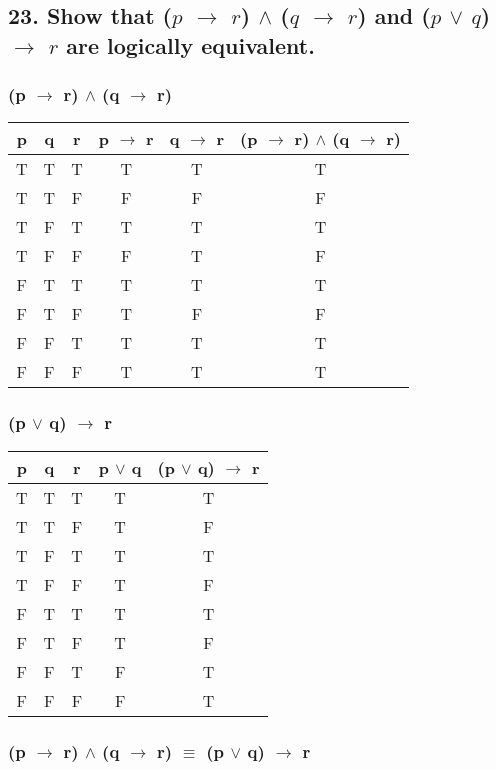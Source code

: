 \documentclass[11pt, oneside]{article} %
\numberwithin{equation}{section} %
\numberwithin{figure}{section} %
\numberwithin{table}{section} %
\begin{document}
\begin{table}[!htbp]
\subsection{23. Show that ($p$ $\rightarrow$ $r$) $\wedge$ ($q$ $\rightarrow$ $r$) and ($p$ $\vee$ $q$) $\rightarrow$ $r$ are logically equivalent.}
\subsubsection{(p $\rightarrow$ r) $\wedge$ (q $\rightarrow$ r)}
\begin{tabular}{c c c c c c}
\hline\hline
p & q & r & p $\rightarrow$ r & q $\rightarrow$ r & (p $\rightarrow$ r) $\wedge$ (q $\rightarrow$ r)\\ [0.5ex] 
\hline
T & T & T & T & T & T\\
T & T & F & F & F & F\\
T & F & T & T & T & T\\
T & F & F & F & T & F\\
F & T & T & T & T & T\\
F & T & F & T & F & F\\
F & F & T & T & T & T\\
F & F & F & T & T & T\\ [1ex]
\hline
\end{tabular}
\label{table:nonlin}
\end{table}

\begin{table}[!htbp]
\subsubsection{(p $\vee$ q) $\rightarrow$ r}
\begin{tabular}{c c c c c}
\hline\hline
p & q & r & p $\vee$ q & (p $\vee$ q) $\rightarrow$ r \\ [0.5ex] 
\hline
T & T & T & T & T\\
T & T & F & T & F\\
T & F & T & T & T\\
T & F & F & T & F\\
F & T & T & T & T\\
F & T & F & T & F\\
F & F & T & F & T\\
F & F & F & F & T\\ [1ex]
\hline
\end{tabular}
\label{table:nonlin}
\subsubsection{(p $\rightarrow$ r) $\wedge$ (q $\rightarrow$ r) $\equiv$ (p $\vee$ q) $\rightarrow$ r}
\end{table}
\end{document}
